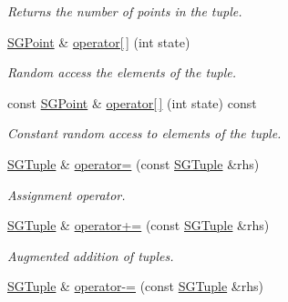 \begin{DoxyCompactItemize}
\begin{DoxyCompactList}\small\item\em Returns the number of points in the tuple. \end{DoxyCompactList}\item 
\hypertarget{class_s_g_tuple_afdc495d4532e5935f37e34b29e688867}{\hyperlink{class_s_g_point}{S\+G\+Point} \& \hyperlink{class_s_g_tuple_afdc495d4532e5935f37e34b29e688867}{operator\mbox{[}$\,$\mbox{]}} (int state)}\label{class_s_g_tuple_afdc495d4532e5935f37e34b29e688867}

\begin{DoxyCompactList}\small\item\em Random access the elements of the tuple. \end{DoxyCompactList}\item 
\hypertarget{class_s_g_tuple_a93d85ccd16400b44a892d330f8b32d45}{const \hyperlink{class_s_g_point}{S\+G\+Point} \& \hyperlink{class_s_g_tuple_a93d85ccd16400b44a892d330f8b32d45}{operator\mbox{[}$\,$\mbox{]}} (int state) const }\label{class_s_g_tuple_a93d85ccd16400b44a892d330f8b32d45}

\begin{DoxyCompactList}\small\item\em Constant random access to elements of the tuple. \end{DoxyCompactList}\item 
\hypertarget{class_s_g_tuple_a1274463fbd40d837c0167252555156e0}{\hyperlink{class_s_g_tuple}{S\+G\+Tuple} \& \hyperlink{class_s_g_tuple_a1274463fbd40d837c0167252555156e0}{operator=} (const \hyperlink{class_s_g_tuple}{S\+G\+Tuple} \&rhs)}\label{class_s_g_tuple_a1274463fbd40d837c0167252555156e0}

\begin{DoxyCompactList}\small\item\em Assignment operator. \end{DoxyCompactList}\item 
\hypertarget{class_s_g_tuple_acf8c7d73d8f2704979ca44b0c755ecc7}{\hyperlink{class_s_g_tuple}{S\+G\+Tuple} \& \hyperlink{class_s_g_tuple_acf8c7d73d8f2704979ca44b0c755ecc7}{operator+=} (const \hyperlink{class_s_g_tuple}{S\+G\+Tuple} \&rhs)}\label{class_s_g_tuple_acf8c7d73d8f2704979ca44b0c755ecc7}

\begin{DoxyCompactList}\small\item\em Augmented addition of tuples. \end{DoxyCompactList}\item 
\hypertarget{class_s_g_tuple_ae3c5e1bb4faf5fb652cdb8440133d2de}{\hyperlink{class_s_g_tuple}{S\+G\+Tuple} \& \hyperlink{class_s_g_tuple_ae3c5e1bb4faf5fb652cdb8440133d2de}{operator-\/=} (const \hyperlink{class_s_g_tuple}{S\+G\+Tuple} \&rhs)}\label{class_s_g_tuple_ae3c5e1bb4faf5fb652cdb8440133d2de}


\end{DoxyCompactItemize}

